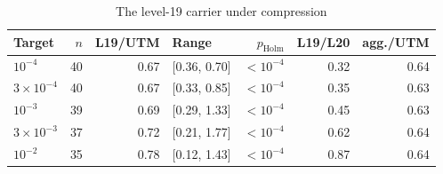 \begin{table}[t]
\centering
\caption{The level-19 carrier under compression}
\label{tab:level19_rd}
\footnotesize
\setlength{\tabcolsep}{3pt}
\begin{tabular}{@{}lrrlrrr@{}}
\toprule
Target & $n$ & L19/UTM & Range & $p_{\mathrm{Holm}}$ & L19/L20 & agg./UTM \\
\midrule
$10^{-4}$ & 40 & 0.67 & [0.36, 0.70] & $<10^{-4}$ & 0.32 & 0.64 \\
$3\times10^{-4}$ & 40 & 0.67 & [0.33, 0.85] & $<10^{-4}$ & 0.35 & 0.63 \\
$10^{-3}$ & 39 & 0.69 & [0.29, 1.33] & $<10^{-4}$ & 0.45 & 0.63 \\
$3\times10^{-3}$ & 37 & 0.72 & [0.21, 1.77] & $<10^{-4}$ & 0.62 & 0.64 \\
$10^{-2}$ & 35 & 0.78 & [0.12, 1.43] & $<10^{-4}$ & 0.87 & 0.64 \\
\bottomrule
\end{tabular}

\end{table}
